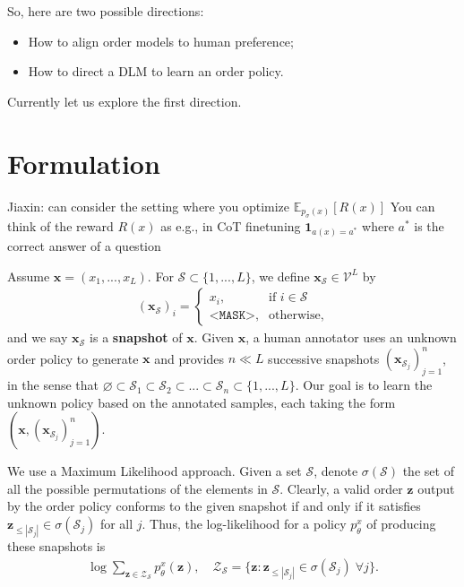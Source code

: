 So, here are two possible directions:
\begin{itemize}[itemsep=-4pt,topsep=0pt]
    \item How to align order models to human preference;
    \item How to direct a DLM to learn an order policy.
\end{itemize}

Currently let us explore the first direction.

\section{Formulation}

Jiaxin: can consider the setting where you optimize 
$\mathbb{E}_{p_\sigma(x)}[R(x)]$
You can think of the reward $R(x)$ as e.g., in CoT finetuning $\mathbf{1}_{a(x)=a^*}$ where $a^*$ is the correct answer of a question

Assume $\bm x=(x_1,...,x_L)$. For $\mathcal S\subset\{1,...,L\}$, we define $\bm x_{\mathcal S}\in\mathcal V^L$ by
\begin{align*}
    (\bm x_\mathcal S)_i=\begin{cases}
        x_i,&\text{if }i\in\mathcal S\\
        \texttt{<MASK>},&\text{otherwise},
    \end{cases}
\end{align*}
and we say $\bm x_\mathcal S$ is a \textbf{snapshot} of $\bm x$. Given $\bm x$, a human annotator uses an unknown order policy to generate $\bm x$ and provides $n\ll L$ successive snapshots $(\bm x_{\mathcal S_j})_{j=1}^n$, in the sense that $\varnothing\subset\mathcal S_1\subset\mathcal S_2\subset...\subset\mathcal S_n\subset\{1,...,L\}$. Our goal is to learn the unknown policy based on the annotated samples, each taking the form $(\bm x,(\bm x_{\mathcal S_j})_{j=1}^n)$.

We use a Maximum Likelihood approach. Given a set $\mathcal S$, denote $\sigma(\mathcal S)$ the set of all the possible permutations of the elements in $\mathcal S$. Clearly, a valid order $\bm z$ output by the order policy conforms to the given snapshot if and only if it satisfies $\bm z_{\leq|\mathcal S_j|}\in\sigma(\mathcal S_j)$ for all $j$. Thus, the log-likelihood for a policy $p_\theta^x$ of producing these snapshots is
\begin{align*}
    \log\sum_{\bm z\in\mathcal Z_\mathcal S} p_\theta^x(\bm z),\quad\mathcal Z_\mathcal S=\{\bm z:\bm z_{\leq|\mathcal S_j|}\in\sigma(\mathcal S_j)\;\forall j\}.
\end{align*}

